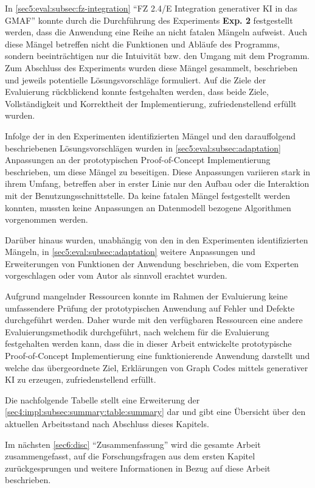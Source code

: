 
In \cref{sec5:eval:subsec:fz-integration} \enquote{FZ 2.4/E Integration generativer KI in das GMAF} konnte durch die Durchführung des Experiments \textbf{Exp. 2} festgestellt werden, dass die Anwendung eine Reihe an nicht fatalen Mängeln aufweist.
Auch diese Mängel betreffen nicht die Funktionen und Abläufe des Programms, sondern beeinträchtigen nur die Intuivität bzw. den Umgang mit dem Programm.
Zum Abschluss des Experiments wurden diese Mängel gesammelt, beschrieben und jeweils potentielle Lösungsvorschläge formuliert.
Auf die Ziele der Evaluierung rückblickend konnte festgehalten werden, dass beide Ziele, Vollständigkeit und Korrektheit der Implementierung, zufriedenstellend erfüllt wurden.

Infolge der in den Experimenten identifizierten Mängel und den darauffolgend beschriebenen Lösungsvorschlägen wurden in \cref{sec5:eval:subsec:adaptation} Anpassungen an der prototypischen Proof-of-Concept Implementierung beschrieben, um diese Mängel zu beseitigen.
Diese Anpassungen variieren stark in ihrem Umfang, betreffen aber in erster Linie nur den Aufbau oder die Interaktion mit der Benutzungsschnittstelle.
Da keine fatalen Mängel festgestellt werden konnten, mussten keine Anpassungen an Datenmodell bezogene Algorithmen vorgenommen werden.

Darüber hinaus wurden, unabhängig von den in den Experimenten identifizierten Mängeln, in \cref{sec5:eval:subsec:adaptation} weitere Anpassungen und Erweiterungen von Funktionen der Anwendung beschrieben, die vom Experten vorgeschlagen oder vom Autor als sinnvoll erachtet wurden.

Aufgrund mangelnder Ressourcen konnte im Rahmen der Evaluierung keine umfassendere Prüfung der prototypischen Anwendung auf Fehler und Defekte durchgeführt werden.
Daher wurde mit den verfügbaren Ressourcen eine andere Evaluierungsmethodik durchgeführt, nach welchem für die Evaluierung festgehalten werden kann, dass die in dieser Arbeit entwickelte prototypische Proof-of-Concept Implementierung eine funktionierende Anwendung darstellt und welche das übergeordnete Ziel, Erklärungen von Graph Codes mittels generativer KI zu erzeugen, zufriedenstellend erfüllt.

Die nachfolgende Tabelle stellt eine Erweiterung der \cref{sec4:impl:subsec:summary:table:summary} dar und gibt eine Übersicht über den aktuellen Arbeitsstand nach Abschluss dieses Kapitels.



Im nächsten \cref{sec6:disc} \enquote{Zusammenfassung} wird die gesamte Arbeit zusammengefasst, auf die Forschungsfragen aus dem ersten Kapitel zurückgesprungen und weitere Informationen in Bezug auf diese Arbeit beschrieben.
